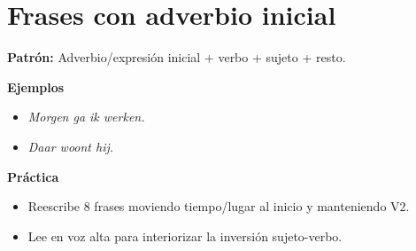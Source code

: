 \section{Frases con adverbio inicial}
\textbf{Patrón:} Adverbio/expresión inicial + verbo + sujeto + resto.

\textbf{Ejemplos}
\begin{itemize}[leftmargin=*]
  \item \textit{Morgen ga ik werken.}
  \item \textit{Daar woont hij.}
\end{itemize}

\textbf{Práctica}
\begin{itemize}[leftmargin=*]
  \item Reescribe 8 frases moviendo tiempo/lugar al inicio y manteniendo V2.
  \item Lee en voz alta para interiorizar la inversión sujeto-verbo.
\end{itemize}
